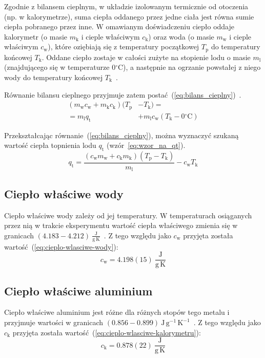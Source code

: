 \documentclass[twocolumn, a4paper, polish, 10pt]{article}
\newcommand{\Tp}{\ensuremath{ T_{\mathrm{p}} }}
\newcommand{\Tk}{\ensuremath{ T_{\mathrm{k}} }}
\newcommand{\mK}{\ensuremath{ m_{\mathrm{k}} }}
\newcommand{\mW}{\ensuremath{ m_{\mathrm{w}} }}
\newcommand{\mL}{\ensuremath{ m_{\mathrm{l}} }}
\newcommand{\cW}{\ensuremath{ c_{\mathrm{w}} }}
\newcommand{\cK}{\ensuremath{ c_{\mathrm{k}} }}
\newcommand{\qT}{\ensuremath{ q_{\mathrm{t}} }}
\newcommand{\degCel}{\ensuremath{ \mathrm{^{\circ}C} }}
\begin{document}
Zgodnie z bilansem cieplnym, w układzie izolowanym termicznie od otoczenia (np. w kalorymetrze), suma ciepła oddanego przez jedne ciała jest równa sumie ciepła pobranego przez inne.
W omawianym doświadczeniu ciepło oddaje kalorymetr (o masie $\mK$ i cieple właściwym $\cK$) oraz woda (o masie $\mW$ i cieple właściwym $\cW$), które oziębiają się z temperatury początkowej $\Tp$ do temperatury końcowej $\Tk$.
Oddane ciepło zostaje w całości zużyte na stopienie lodu o masie $\mL$ (znajdującego się w temperaturze $0\degCel$), a następnie na ogrzanie powstałej z niego wody do temperatury końcowej $\Tk$~\cite{pracownia-fizyczna-c4}.

Równanie bilansu cieplnego przyjmuje zatem postać~(\ref{eq:bilans_cieplny})~\cite{pracownia-fizyczna-c4}.
\begin{equation}
\begin{split}
    (\mW \cW + \mK \cK)(\Tp &- \Tk) = \\
    = \mL \qT &+ \mL \cW (\Tk - 0\degCel)
    \label{eq:bilans_cieplny}
\end{split}
\end{equation}

Przekształcając równanie~(\ref{eq:bilans_cieplny}), można wyznaczyć szukaną wartość ciepła topnienia lodu $\qT$ (wzór~\ref{eq:wzor_na_qt}).
\begin{equation}
    \qT = \frac{(\cW \mW + \cK \mK)(\Tp - \Tk)}{\mL} - \cW \Tk
    \label{eq:wzor_na_qt}
\end{equation}

\subsection{Ciepło właściwe wody}
Ciepło właściwe wody zależy od jej temperatury.
W temperaturach osiąganych przez nią w trakcie eksperymentu wartość ciepła właściwego zmienia się w granicach $(4.183 - 4.212)~\mathrm{\frac{J}{g~K}}$~\cite{parametry-fizyczne-wody}. Z tego względu jako $\cW$ przyjęta została wartość~(\ref{eq:cieplo-wlasciwe-wody}):
\begin{equation}
    \cW = 4.198(15)~\mathrm{\frac{J}{g \,K}}
    \label{eq:cieplo-wlasciwe-wody}
\end{equation}

\subsection{Ciepło właściwe aluminium}
Ciepło właściwe aluminium jest różne dla różnych stopów tego metalu i przyjmuje wartości w granicach $(0.856 - 0.899)~\mathrm{J \, g^{-1} \, K^{-1}}$~\cite{wlasciwosci-aluminium}.
Z tego względu jako $\cK$ przyjęta została wartość~(\ref{eq:cieplo-wlasciwe-kalorymetru}):
\begin{equation}
    \cK = 0.878(22)~\mathrm{\frac{J}{g \, K}}
    \label{eq:cieplo-wlasciwe-kalorymetru}
\end{equation}
\end{document}
